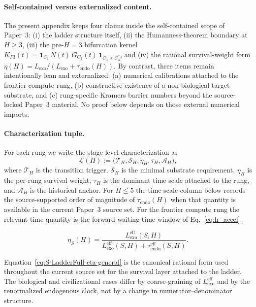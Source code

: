 \documentclass[11pt]{article}
\begin{document}
\paragraph{Self-contained versus externalized content.}
The present appendix keeps four claims inside the self-contained scope of
Paper~3:
(i) the ladder structure itself,
(ii) the Humanness-theorem boundary at $H\ge 3$,
(iii) the pre-$H{=}3$ bifurcation kernel
$K_{P3}(t)=\mathbf{1}_{C_1}\,N(t)\,G_{C_2}(t)\,\mathbf{1}_{C_3\ge C_3^{\ast}}$,
and
(iv) the rational survival-weight form
$\eta(H)=L_{\mathrm{exo}}/(L_{\mathrm{exo}}+\tau_{\mathrm{endo}}(H))$.
By contrast, three items remain intentionally lean and externalized:
(a) numerical calibrations attached to the frontier compute rung,
(b) constructive existence of a non-biological target substrate, and
(c) rung-specific Kramers barrier numbers beyond the source-locked Paper~3
material.
No proof below depends on those external numerical imports.

\paragraph{Characterization tuple.}
For each rung we write the stage-level characterization as
\begin{equation}
\mathcal{L}(H)
:=
\bigl(
\mathcal{T}_H,
\mathcal{S}_H,
\eta_H,
\tau_H,
\mathcal{A}_H
\bigr),
\label{eq:S-LadderFull-tuple}
\end{equation}
where
$\mathcal{T}_H$ is the transition trigger,
$\mathcal{S}_H$ is the minimal substrate requirement,
$\eta_H$ is the per-rung survival weight,
$\tau_H$ is the dominant time scale attached to the rung,
and
$\mathcal{A}_H$ is the historical anchor.
For $H\le 5$ the time-scale column below records the source-supported
order of magnitude of $\tau_{\mathrm{endo}}(H)$ when that quantity is
available in the current Paper~3 source set.
For the frontier compute rung the relevant time quantity is the forward
waiting-time window of Eq.~\eqref{eq:h_accel}.

\begin{equation}
\eta_S(H)
=
\frac{L_{\mathrm{exo}}^{\mathrm{eff}}(S,H)}
     {L_{\mathrm{exo}}^{\mathrm{eff}}(S,H)+\tau_{\mathrm{endo}}^{\mathrm{eff}}(S,H)}.
\label{eq:S-LadderFull-eta-general}
\end{equation}

\noindent
Equation~\eqref{eq:S-LadderFull-eta-general} is the canonical rational form
used throughout the current source set for the survival layer attached to the
ladder.  The biological and civilizational cases differ by coarse-graining of
$L_{\mathrm{exo}}^{\mathrm{eff}}$ and by the renormalized endogenous clock,
not by a change in numerator--denominator structure.
\end{document}
